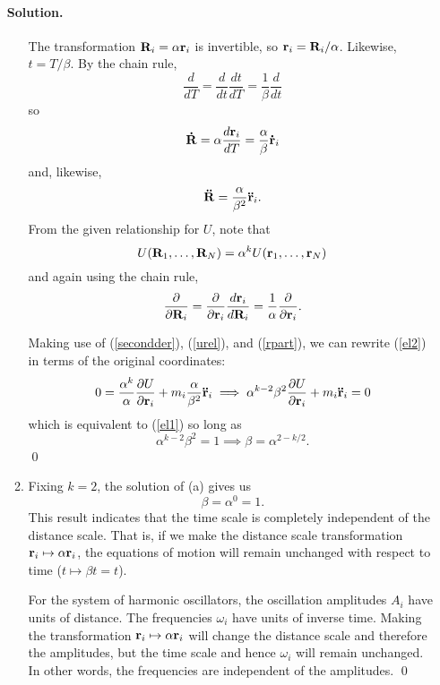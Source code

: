 \documentclass[11pt]{article}
\newcommand{\pder}[2]{\frac{\partial#1}{\partial#2}}
\newcommand{\der}[2]{\frac{d#1}{d#2}}
\newcommand{\refeq}[1]{(\ref{#1})}
\newenvironment{solution}
{
    \paragraph{Solution.}
    \ignorespaces
}
{
    \bigskip\bigskip
}
\begin{document}
\begin{enumerate}
\begin{solution}
\begin{enumerate}
			The transformation $\mathbf{R}_i = \alpha \mathbf{r}_i$ is invertible, so $\mathbf{r}_i = \mathbf{R}_i / \alpha$.  Likewise, $t = T / \beta$.  By the chain rule,
			\begin{equation} \label{transT}
				\der{}{T} = \der{}{t} \der{t}{T} = \frac{1}{\beta} \der{}{t}
			\end{equation}
			so
			\begin{equation}
				\vRd = \alpha \der{\vr_i}{T} = \frac{\alpha}{\beta} \vrd_i
			\end{equation}
			and, likewise,
			\begin{equation} \label{secondder}
				\mathbf{\ddot{R}} = \frac{\alpha}{\beta^2} \mathbf{\ddot{r}}_i.
			\end{equation}
			From the given relationship for $U$, note that
			\begin{equation} \label{urel}
				U(\mathbf{R}_1, \ldots, \mathbf{R}_N) = \alpha^k U(\mathbf{r}_1, \ldots, \mathbf{r}_N)
			\end{equation}
			and again using the chain rule,
			\begin{equation} \label{rpart}
				\pder{}{\vR_i} = \pder{}{\vr_i} \der{\vr_i}{\vR_i} = \frac{1}{\alpha} \pder{}{\vr_i}.
			\end{equation}
			
			Making use of \refeq{secondder}, \refeq{urel}, and \refeq{rpart}, we can rewrite \refeq{el2} in terms of the original coordinates:
			\begin{equation}
			0 = \frac{\alpha^k}{\alpha} \pder{U}{\vr_i} + m_i \frac{\alpha}{\beta^2} \vrdd_i \implies \alpha^{k-2} \beta^2 \pder{U}{\vr_i} + m_i \vrdd_i = 0
			\end{equation}
			which is equivalent to \refeq{el1} so long as
			\begin{equation} \label{result}
				\alpha^{k-2} \beta^2 = 1 \implies \beta = \alpha^{{2-k}/2}.
			\end{equation}
			\qed
			
			
			\item Fixing $k = 2$, the solution of (a) gives us
			\begin{equation} \label{betab}
				\beta = \alpha^0 = 1.
			\end{equation}
			This result indicates that the time scale is completely independent of the distance scale.  That is, if we make the distance scale transformation $\mathbf{r}_i \mapsto \alpha \mathbf{r}_i$, the equations of motion will remain unchanged with respect to time ($t \mapsto \beta t = t$).

			For the system of harmonic oscillators, the oscillation amplitudes $A_i$ have units of distance.  The frequencies $\omega_i$ have units of inverse time.  Making the transformation $\mathbf{r}_i \mapsto \alpha \mathbf{r}_i$ will change the distance scale and therefore the amplitudes, but the time scale and hence $\omega_i$ will remain unchanged.  In other words, the frequencies are independent of the amplitudes. \qed


\end{enumerate}
\end{solution}
\end{enumerate}
\end{document}

